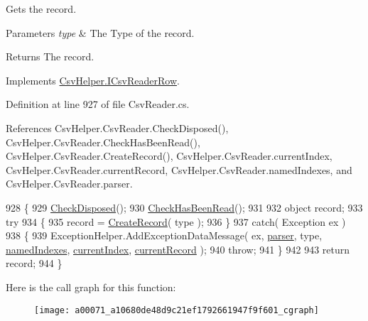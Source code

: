 Gets the record. 


\begin{DoxyParams}{Parameters}
{\em type} & The Type of the record.\\
\hline
\end{DoxyParams}
\begin{DoxyReturn}{Returns}
The record.
\end{DoxyReturn}


Implements \hyperlink{a00109_a911748932ed897a2e7086c0c49bdceea}{Csv\-Helper.\-I\-Csv\-Reader\-Row}.



Definition at line 927 of file Csv\-Reader.\-cs.



References Csv\-Helper.\-Csv\-Reader.\-Check\-Disposed(), Csv\-Helper.\-Csv\-Reader.\-Check\-Has\-Been\-Read(), Csv\-Helper.\-Csv\-Reader.\-Create\-Record(), Csv\-Helper.\-Csv\-Reader.\-current\-Index, Csv\-Helper.\-Csv\-Reader.\-current\-Record, Csv\-Helper.\-Csv\-Reader.\-named\-Indexes, and Csv\-Helper.\-Csv\-Reader.\-parser.


\begin{DoxyCode}
928         \{
929             \hyperlink{a00071_a6fa45a46ed1322dc1872ca2321b5edbc}{CheckDisposed}();
930             \hyperlink{a00071_a2d9249171ed1568e45d152766d364c31}{CheckHasBeenRead}();
931 
932             \textcolor{keywordtype}{object} record;
933             \textcolor{keywordflow}{try}
934             \{
935                 record = \hyperlink{a00071_a722545ede4e575795ee9a73f6ada0ac7}{CreateRecord}( type );
936             \}
937             \textcolor{keywordflow}{catch}( Exception ex )
938             \{
939                 ExceptionHelper.AddExceptionDataMessage( ex, \hyperlink{a00071_aaf2ee64c7a157027aea69bfae1fa9edc}{parser}, type, 
      \hyperlink{a00071_a3114f49bd2b3c4966f4b15a310747aeb}{namedIndexes}, \hyperlink{a00071_a56e974bc7e2242912e956393e831e166}{currentIndex}, \hyperlink{a00071_ab2bfef15784add66e441c9d3a0d73751}{currentRecord} );
940                 \textcolor{keywordflow}{throw};
941             \}
942 
943             \textcolor{keywordflow}{return} record;
944         \}
\end{DoxyCode}


Here is the call graph for this function\-:
\nopagebreak
\begin{figure}[H]
\begin{center}
\leavevmode
\texttt{[image: a00071\_a10680de48d9c21ef1792661947f9f601\_cgraph]}
\end{center}
\end{figure}


